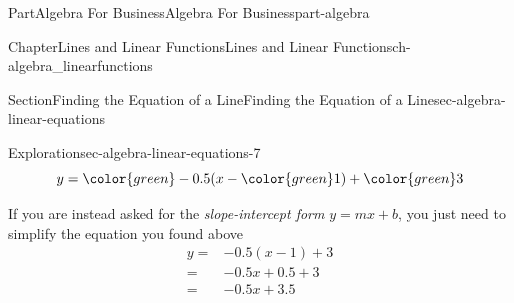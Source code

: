 \documentclass[oneside,10pt,]{tufte-book}
\numberwithin{equation}{chapter}
\newcommand{\amp}{&}
\begin{document}
\begin{partptx}{Part}{Algebra For Business}{}{Algebra For Business}{}{}{part-algebra}
\begin{chapterptx}{Chapter}{Lines and Linear Functions}{}{Lines and Linear Functions}{}{}{ch-algebra_linearfunctions}
\begin{sectionptx}{Section}{Finding the Equation of a Line}{}{Finding the Equation of a Line}{}{}{sec-algebra-linear-equations}
\begin{exploration}{Exploration}{}{sec-algebra-linear-equations-7}
\begin{equation*}
y = {\color{green} -0.5} (x - { \color{green} 1}) + {\color{green} 3}
\end{equation*}
%
\par
If you are instead asked for the \emph{slope-intercept form} \(y=mx+b\), you just need to simplify the equation you found above%
\begin{align*}
y = \amp {-0.5} (x - {1}) + {3} \\
= \amp -0.5 x + 0.5 + 3 \\
= \amp -0.5 x + 3.5 
\end{align*}
%
\begin{image}{0.25}{0.5}{0.25}{}%
\end{image}
\end{exploration}
\end{sectionptx}
\end{chapterptx}
\end{partptx}
\end{document}
